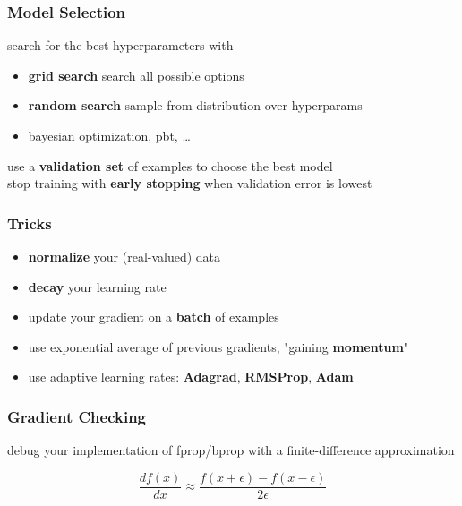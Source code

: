 \documentclass[]{article}
\theoremstyle{definition}
\begin{document}
    \subsubsection{Model Selection}%
    \label{ssub:model_selection}

    search for the best hyperparameters with
    \begin{itemize}
        \item \textbf{grid search} search all possible options
        \item \textbf{random search} sample from distribution over hyperparams
        \item bayesian optimization, pbt, \ldots
    \end{itemize}

    use a \textbf{validation set} of examples to choose the best model \\
    stop training with \textbf{early stopping} when validation error is lowest

    \subsubsection{Tricks}%
    \label{ssub:tricks}

    \begin{itemize}
        \item \textbf{normalize} your (real-valued) data
        \item \textbf{decay} your learning rate
        \item update your gradient on a \textbf{batch} of examples
        \item use exponential average of previous gradients, "gaining \textbf{momentum}"
        \item use adaptive learning rates: \textbf{Adagrad}, \textbf{RMSProp}, \textbf{Adam}
    \end{itemize}

    \subsubsection{Gradient Checking}%
    \label{ssub:gradient_checking}

    debug your implementation of fprop/bprop with a finite-difference approximation

    \begin{equation*}
        \frac{df(x)}{dx} \approx \frac{f(x + \epsilon) - f(x - \epsilon)}{2\epsilon}
    \end{equation*}
\end{document}
